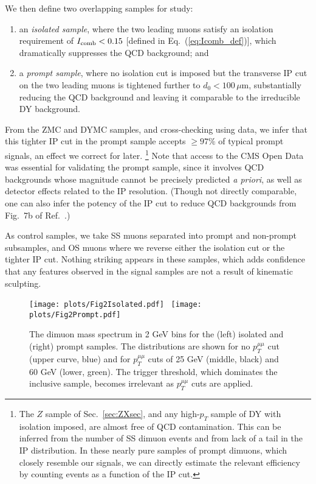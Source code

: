 \documentclass[aps,prd,twocolumn,superscriptaddress,preprintnumbers,nofootinbib,longbibliography,floatfix]{revtex4-1}
\newcommand{\ptmm}{p_T^{\mu\mu}}
\DeclareRobustCommand{\Sec}[1]{Sec.~\ref{#1}}
\DeclareRobustCommand{\Eq}[1]{Eq.~(\ref{#1})}
\DeclareRobustCommand{\Ref}[1]{Ref.~\cite{#1}}
\begin{document}
We then define two overlapping samples for study:
%
\begin{enumerate}
%
\item an {\it isolated sample}, where the two leading muons satisfy an isolation requirement of $I_{\rm comb} <0.15$
[defined in \Eq{eq:Icomb_def}], which dramatically suppresses the QCD background; and 
%
\item a {\it prompt sample}, where no isolation cut is imposed but the transverse IP cut on the two leading muons is tightened further to $d_0<100 \, \mu$m, substantially reducing the QCD background and leaving it comparable to the irreducible DY background. 
%
\end{enumerate}
%
From the ZMC and DYMC samples, and cross-checking using data,
%
we infer that this tighter IP cut in the prompt sample accepts $\geq97\%$ of typical prompt signals, an effect we correct for later.%
%
\footnote{The $Z$ sample of \Sec{sec:ZXsec}, and any high-$p_T$ sample of DY with isolation imposed, are almost free of QCD contamination.
This can be inferred from the number of SS dimuon events and from lack of a tail in the IP distribution.
In these nearly pure samples of prompt dimuons, which closely resemble our signals, we can directly estimate the relevant efficiency by counting events as a function of the IP cut.}
%
 Note that access to the CMS Open Data was essential for validating the prompt sample, since it involves QCD backgrounds whose magnitude cannot be precisely predicted {\it a priori}, as well as detector effects related to the IP resolution.
%
(Though not directly comparable, one can also infer the potency of the IP cut to reduce QCD backgrounds from Fig.~7b of \Ref{Chatrchyan:2012xi}.)

As control samples, we take SS muons separated into prompt and non-prompt subsamples, and OS muons where we reverse either the isolation cut or the tighter IP cut.
% 
Nothing striking appears in these samples, which adds confidence that any features observed in the signal samples are not a result of kinematic sculpting.


\begin{figure*}[t]  
\begin{center}  
\leavevmode
\vskip 0.0in
\texttt{[image: plots/Fig2Isolated.pdf]} \
\texttt{[image: plots/Fig2Prompt.pdf]} 
\end{center}
\vskip -0.20in  
\caption{The dimuon mass spectrum in 2 GeV bins for the (left) isolated and (right) prompt samples.
%
The distributions are shown for no $\ptmm$ cut (upper curve, blue) and for $\ptmm$ cuts of 25 GeV (middle, black) and 60 GeV (lower, green).
%
The trigger threshold, which dominates the inclusive sample, becomes irrelevant as $\ptmm$ cuts are applied.}  
\label{fig:DataByPtCut}
\end{figure*}
\end{document}
